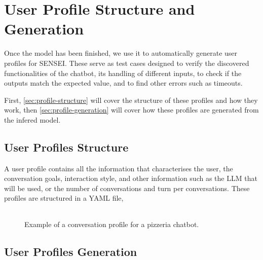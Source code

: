 
\chapter{User Profile Structure and Generation}\label{chapter:user_profiles}

Once the model has been finished,
we use it to automatically generate user profiles for SENSEI.
These serve as test cases designed to verify
the discovered functionalities of the chatbot,
its handling of different inputs,
to check if the outputs match the expected value,
and to find other errors such as timeouts.

First, \autoref{sec:profile-structure}
will cover the structure of these profiles and how they work,
then \autoref{sec:profile-generation}
will cover how these profiles are generated from the infered model.


\section{User Profiles Structure}\label{sec:profile-structure}

A user profile contains all the information
that characterises the user,
the conversation goals,
interaction style,
and other information such as the \ac{LLM} that will be used,
or the number of conversations and turn per conversations.
These profiles are structured in a YAML file,

\begin{figure}[htpb]
  \centering
  \begin{tabular}{c}
    
  \end{tabular}
  \caption[Example listing]{Example of a conversation profile for a pizzeria chatbot.}\label{lst:user_profile}
\end{figure}

\section{User Profiles Generation}\label{sec:profile-generation}


